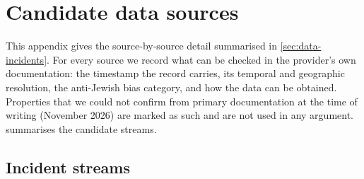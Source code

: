 \section{Candidate data sources}\label{app:data}

This appendix gives the source-by-source detail summarised in \cref{sec:data-incidents}.
For every source we record what can be checked in the provider's own documentation: the
timestamp the record carries, its temporal and geographic resolution, the anti-Jewish bias
category, and how the data can be obtained. Properties that we could not confirm from
primary documentation at the time of writing (November 2026) are marked as such and are not
used in any argument.  summarises the candidate streams.

\subsection{Incident streams}\label{app:data-incidents}

